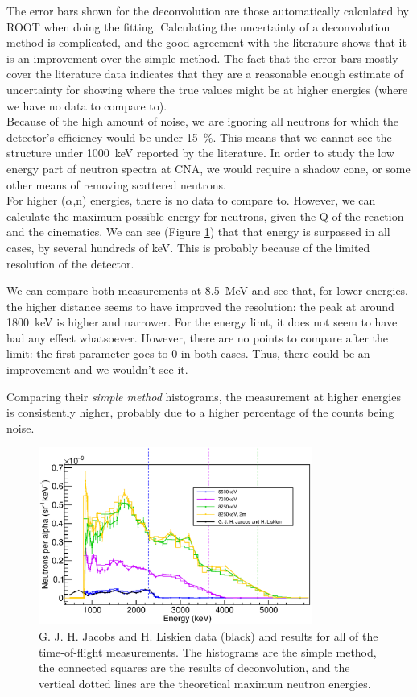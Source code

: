 \documentclass[a4paper,12pt]{report}
\newcommand{\an}{($\alpha$,n) }
\begin{document}
The error bars shown for the deconvolution are those automatically calculated by ROOT when doing the fitting.
Calculating the uncertainty of a deconvolution method is complicated, and the good agreement with the literature shows that it is an improvement over the simple method.
The fact that the error bars mostly cover the literature data indicates that they are a reasonable enough estimate of uncertainty for showing where the true values might be at higher energies (where we have no data to compare to).
\\

Because of the high amount of noise, we are ignoring all neutrons for which the detector's efficiency would be under \qty{15}{\percent}.
This means that we cannot see the structure under \qty{1000}{\keV} reported by the literature.
In order to study the low energy part of neutron spectra at CNA, we would require a shadow cone, or some other means of removing scattered neutrons.
\\

For higher \an energies, there is no data to compare to.
However, we can calculate the maximum possible energy for neutrons, given the Q of the reaction and the cinematics.
We can see (Figure \ref{pulsed_results}) that that energy is surpassed in all cases, by several hundreds of \unit{\keV}.
This is probably because of the limited resolution of the detector.

We can compare both measurements at \qty{8.5}{\MeV} and see that, for lower energies, the higher distance seems to have improved the resolution: the peak at around \qty{1800}{\keV} is higher and narrower.
For the energy limt, it does not seem to have had any effect whatsoever.
However, there are no points to compare after the limit: the first parameter goes to 0 in both cases.
Thus, there could be an improvement and we wouldn't see it.

Comparing their \textit{simple method} histograms, the measurement at higher energies is consistently higher, probably due to a higher percentage of the counts being noise.
\\

\begin{figure}[H]
	\centering
	\includegraphics[width=0.80\textwidth]{pulsed_results.eps}
	\caption{G. J. H. Jacobs and H. Liskien data (black) and results for all of the time-of-flight measurements.
	The histograms are the simple method, the connected squares are the results of deconvolution, and the vertical dotted lines are the theoretical maximum neutron energies.}
	\label{pulsed_results}
\end{figure}
\end{document}
